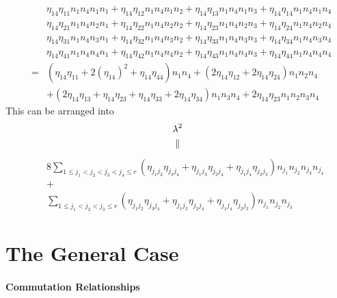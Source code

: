 \documentclass[12pt]{article}
\begin{document}
\begin{eqnarray}
&&\eta _{14}\eta _{11}n_{1}n_{4}n_{1}n_{1}+\eta _{14}\eta
_{12}n_{1}n_{4}n_{1}n_{2}+\eta _{14}\eta _{13}n_{1}n_{4}n_{1}n_{3}+\eta
_{14}\eta _{14}n_{1}n_{4}n_{1}n_{4} \\
&&\eta _{14}\eta _{21}n_{1}n_{4}n_{2}n_{1}+\eta _{14}\eta
_{22}n_{1}n_{4}n_{2}n_{2}+\eta _{14}\eta _{23}n_{1}n_{4}n_{2}n_{3}+\eta
_{14}\eta _{24}n_{1}n_{4}n_{2}n_{4} \\
&&\eta _{14}\eta _{31}n_{1}n_{4}n_{3}n_{1}+\eta _{14}\eta
_{32}n_{1}n_{4}n_{3}n_{2}+\eta _{14}\eta _{33}n_{1}n_{4}n_{3}n_{3}+\eta
_{14}\eta _{34}n_{1}n_{4}n_{3}n_{4} \\
&&\eta _{14}\eta _{41}n_{1}n_{4}n_{4}n_{1}+\eta _{14}\eta
_{42}n_{1}n_{4}n_{4}n_{2}+\eta _{14}\eta _{43}n_{1}n_{4}n_{4}n_{3}+\eta
_{14}\eta _{44}n_{1}n_{4}n_{4}n_{4} \\
&=&\left( \eta _{14}\eta _{11}+2\left( \eta _{14}\right) ^{2}+\eta _{14}\eta
_{44}\right) n_{1}n_{4}+\left( 2\eta _{14}\eta _{12}+2\eta _{14}\eta
_{24}\right) n_{1}n_{2}n_{4} \\
&&+\left( 2\eta _{14}\eta _{13}+\eta _{14}\eta _{23}+\eta _{14}\eta
_{33}+2\eta _{14}\eta _{34}\right) n_{1}n_{3}n_{4}+2\eta _{14}\eta
_{23}n_{1}n_{2}n_{3}n_{4}
\end{eqnarray}%
This can be arranged into 
\begin{gather}
\lambda ^{2}  \notag \\
\parallel
\end{gather}%
\begin{eqnarray}
&&8\sum_{1\leq j_{1}<j_{2}<j_{3}<j_{4}\leq r}\left( \eta _{j_{1}j_{2}}\eta
_{j_{3}j_{4}}+\eta _{j_{1}j_{3}}\eta _{j_{2}j_{4}}+\eta _{j_{1}j_{4}}\eta
_{j_{2}j_{3}}\right) n_{j_{1}}n_{j_{2}}n_{j_{3}}n_{j_{4}} \\
&&+ \\
&&\sum_{1\leq j_{1}<j_{2}<j_{3}\leq r}\left( \eta _{j_{1}j_{2}}\eta
_{j_{3}j_{4}}+\eta _{j_{1}j_{3}}\eta _{j_{2}j_{4}}+\eta _{j_{1}j_{4}}\eta
_{j_{2}j_{3}}\right) n_{j_{1}}n_{j_{2}}n_{j_{3}}
\end{eqnarray}

\section{The General Case}

\paragraph{\protect\bigskip Commutation Relationships}
\end{document}
